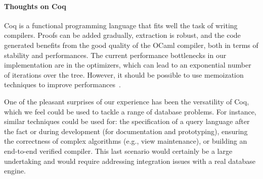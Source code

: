 \paragraph*{Thoughts on Coq}

Coq is a functional programming language that fits well the task of
writing compilers. Proofs can be added gradually, extraction is
robust, and the code generated benefits from the good quality of the
OCaml compiler, both in terms of stability and performances. The
current performance bottlenecks in our implementation are in the
optimizers, which can lead to an exponential number of iterations over
the tree. However, it should be possible to use memoization techniques
to improve performances~\cite{braibant2014implementing}.

One of the pleasant surprises of our experience has been the
versatility of Coq, which we feel could be used to tackle a range of
database problems. For instance, similar techniques could be used for:
the specification of a query language after the fact or during
development (for documentation and prototyping), ensuring the
correctness of complex algorithms (e.g., view maintenance), or
building an end-to-end verified compiler. This last scenario
would certainly be a large undertaking and would require addressing
integration issues with a real database engine.

